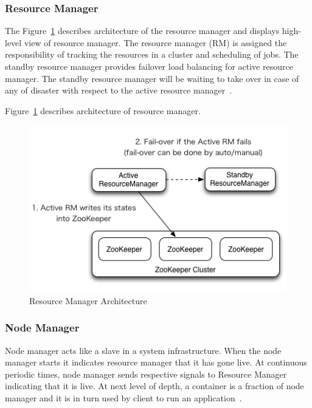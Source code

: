 \subsubsection{Resource Manager}
The Figure~\ref{s:archires} describes 
architecture of the 
resource manager and displays high-level view of 
resource manager. The resource manager (RM) is assigned the responsibility of 
tracking the resources in a cluster and scheduling of jobs. The standby resource 
manager provides failover load balancing for active resource manager. The 
standby resource manager will be waiting to take over in case of any of disaster
with respect to the 
active resource manager~\cite{hid-sp18-412-YARN_Architecture}.

Figure~\ref{s:archires} describes architecture 
of resource manager.

\begin{figure}[!ht]
\centering\includegraphics[width=\textwidth]{images/YARNResourceManager.png}
\caption{Resource 
Manager 
Architecture~\cite{hid-sp18-412-ResourceManager_Architecture}}\label{s:archires}
\end{figure}

\subsubsection{Node Manager}
Node manager acts like a slave in a 
system infrastructure. When the node manager starts it indicates resource 
manager that it has gone live. At continuous periodic times, node manager sends 
respective signals to Resource Manager indicating that it is live. At next level 
of depth, a container is a fraction of node manager and it is in turn used by 
client to run an application~\cite{hid-sp18-412-YARN_Hadoop_Internal}.

